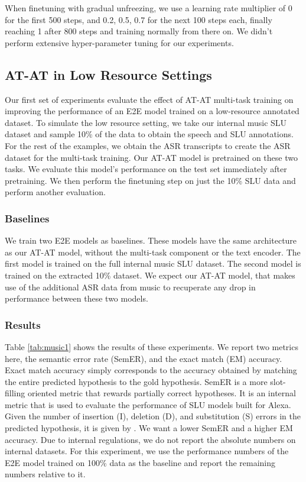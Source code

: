 \documentclass[letterpaper]{article} \usepackage{aaai21}  \usepackage{times}  \usepackage{helvet} \usepackage{courier}  \usepackage[hyphens]{url}  \usepackage{graphicx} \usepackage{booktabs}
\begin{document}
When finetuning with gradual unfreezing, we use a learning rate multiplier of 0 for the first 500 steps, and 0.2, 0.5, 0.7 for the next 100 steps each, finally reaching 1 after 800 steps and training normally from there on. We didn't perform extensive hyper-parameter tuning for our experiments. 


\subsection{AT-AT in Low Resource Settings}
Our first set of experiments evaluate the effect of AT-AT multi-task training on improving the performance of an E2E model trained on a low-resource annotated dataset. To simulate the low resource setting, we take our internal music SLU dataset and sample 10\% of the data to obtain the speech and SLU annotations. For the rest of the examples, we obtain the ASR transcripts to create the ASR dataset for the multi-task training. Our AT-AT model is pretrained on these two tasks. We evaluate this model's performance on the test set immediately after pretraining. We then perform the finetuning step on just the 10\% SLU data and perform another evaluation.
\subsubsection{Baselines}
We train two E2E models as baselines. These models have the same architecture as our AT-AT model, without the multi-task component or the text encoder. The first model is trained on the full internal music SLU dataset. The second model is trained on the extracted 10\% dataset. We expect our AT-AT model, that makes use of the additional ASR data from music to recuperate any drop in performance between these two models. 
\subsubsection{Results}
Table \ref{tab:music1} shows the results of these experiments. We report two metrics here, the semantic error rate (SemER), and the exact match (EM) accuracy. Exact match accuracy simply corresponds to the accuracy obtained by matching the entire predicted hypothesis to the gold hypothesis. SemER is a more slot-filling oriented metric that rewards partially correct hypotheses. It is an internal metric that is used to evaluate the performance of SLU models built for Alexa. Given the number of insertion (I), deletion (D), and substitution (S) errors in the predicted hypothesis, it is given by . 
We want a lower SemER and a higher EM accuracy. Due to internal regulations, we do not report the absolute numbers on internal datasets. For this experiment, we use the performance numbers of the E2E model trained on 100\% data as the baseline and report the remaining numbers relative to it. 
\end{document}
